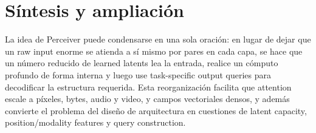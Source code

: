 \section{Síntesis y ampliación}

La idea de Perceiver puede condensarse en una sola oración: en lugar de dejar que un raw input enorme se atienda a sí mismo por pares en cada capa, se hace que un número reducido de learned latents lea la entrada, realice un cómputo profundo de forma interna y luego use task-specific output queries para decodificar la estructura requerida. Esta reorganización facilita que attention escale a píxeles, bytes, audio y video, y campos vectoriales densos, y además convierte el problema del diseño de arquitectura en cuestiones de latent capacity, position/modality features y query construction.

